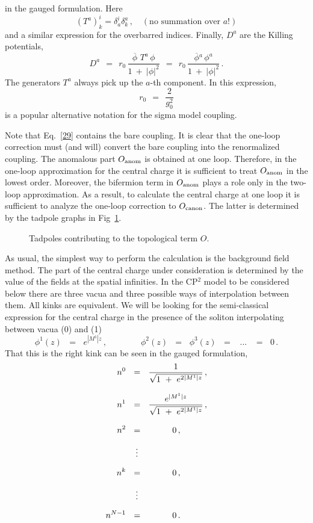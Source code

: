 \documentclass[epsfig,12pt]{article}
\def\beq{\begin{equation}}
\def\eeq{\end{equation}}
\def\beq{\begin{equation}}
\def\eeq{\end{equation}}
\newcommand{\ov}{\overline}
\newcommand{\bphi}{\ov{\phi}{}}
\begin{document}
	in the gauged formulation. 
	Here
 \beq
 	\left(T^a\right)^i_k = \delta_a^i\delta^a_k \,,\quad (\mbox{no summation over $a$!})
 \eeq
	and a similar expression for the overbarred indices.
	Finally,
$ D^a $ 
	are the Killing potentials,
\beq
	D^a  ~~=~~ r_0\, \frac{ \bphi\,\, T^a\, \phi } 
	                    {  1  ~+~  |\phi|^2  }
	     ~~=~~ r_0\, \frac{ \bphi^a\, \phi^a   }
	                    {  1  ~+~  |\phi|^2  }\,.
	                    \label{29}
\eeq
	The generators $ T^a $ always pick up the $ a $-th component.
	In this expression, 
\beq
	r _0  ~~=~~ \frac{ 2 }{ g_0^2}
\eeq 
	is a popular alternative notation for the sigma model coupling.
	
	Note that Eq.~\eqref{29} contains the bare coupling. 
	It is clear that the one-loop correction must (and will) convert the bare coupling  into the renormalized coupling. 
	The anomalous part $O_{\rm anom}$ is obtained at one loop.
	Therefore, in the one-loop approximation for the central charge 
	it is sufficient to treat $O_{\rm anom}$ in the lowest order. Moreover, the bifermion term 
	in $O_{\rm anom}$ plays a role only in the two-loop approximation. 
	As a result, to calculate the central charge at one loop it is sufficient to analyze 
	the one-loop correction to $O_{\rm canon}$. 
	The latter is determined by the tadpole graphs in Fig~\ref{ftad}. 
\begin{figure}
\begin{center}
\epsfxsize=8.0cm
\caption{Tadpoles contributing to the topological term $ O $.}
\label{ftad}
\end{center}
\end{figure}
	As usual, the simplest way to perform the calculation is the background field method.
	The part of the central charge under consideration is determined by the value of the fields at the spatial infinities. 
	In the CP$^2$ model to be considered below there are three vacua and three possible ways
	of interpolation between them. All kinks are equivalent. 
	We will be looking for the semi-classical expression for the central charge in the presence
	of the soliton interpolating between vacua ({\sc \small 0}) and ({\sc \small 1})
\beq
	\phi^1(z)  \,~~=~~\, e^{|M^1| z}\,, \qquad\qquad  \phi^2(z) \,~~=~~\, \phi^3(z) \,~~=~~ \,~...~\, ~~=~~\, 0\,.
\eeq
	That this is the right kink can be seen in the gauged formulation,
\begin{align}
%
\notag
	n^0  & ~~=~~ \frac {             1              }
 	                   {\sqrt{ 1 ~+~ e^{2 |M^1| z} }}\,, \\[3mm]
%
\notag
	n^1  & ~~=~~ \frac {         e^{|M^1| z}        }
 	                   {\sqrt{ 1 ~+~ e^{2 |M^1| z} }}\,, \\[3mm]
%
\notag
	n^2  & ~~=~~ \qquad~~\, 0\,,  \\[2mm]
%	 
	     & ~~~\,\vdots          \\[2mm]
%
\notag
	n^k  & ~~=~~ \qquad~~\, 0\,,  \\[2mm]
%	 
\notag
 	     & ~~~\,\vdots          \\[2mm]
%
\notag
	n^{N-1} & ~~=~~ \qquad~~\, 0\,.                
\end{align}
\end{document}
